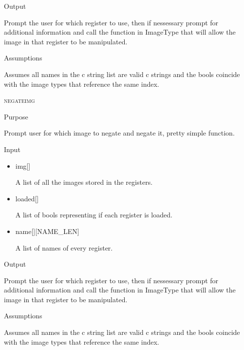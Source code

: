 \documentclass[pdftex, 11pt]{article}
\begin{document}
\begin{description}
\begin{description}
			\item{Output}

				Prompt the user for which register to use, then if nessessary
				prompt for additional information and call the function
				in ImageType that will allow the image in that register to
				be manipulated.

			\item{Assumptions}

				Assumes all names in the c string list are valid c
				strings and the bools coincide with the image types that
				reference the same index.

		\end{description}



	\item{\textsc{negateimg}}
		\begin{description}
			\item{Purpose}

				Prompt user for which image to negate and negate it, pretty simple function.

			\item{Input}

				\begin{itemize}

					\item{img[]}

						A list of all the images stored in the registers.

					\item{loaded[]}

						A list of bools representing if each register is loaded.

					\item{name[][NAME\_LEN]}

						A list of names of every register.

				\end{itemize}

			\item{Output}

				Prompt the user for which register to use, then if nessessary
				prompt for additional information and call the function
				in ImageType that will allow the image in that register to
				be manipulated.

			\item{Assumptions}

				Assumes all names in the c string list are valid c
				strings and the bools coincide with the image types that
				reference the same index.


\end{description}
\end{description}
\end{document}
